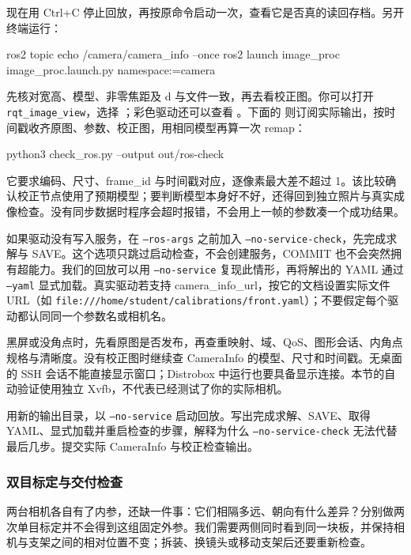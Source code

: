 \begin{example}[从采样界面走到重启后的校正图]
现在用 Ctrl+C 停止回放，再按原命令启动一次，查看它是否真的读回存档。另开终端运行：
\begin{tbash}
ros2 topic echo /camera/camera_info --once
ros2 launch image_proc image_proc.launch.py namespace:=camera
\end{tbash}
先核对宽高、模型、非零焦距及 d 与文件一致，再去看校正图。你可以打开 \texttt{rqt\_image\_view}，选择 ；彩色驱动还可以查看 。下面的  则订阅实际输出，按时间戳收齐原图、参数、校正图，用相同模型再算一次 remap：


\begin{tbash}
python3 check_ros.py --output out/ros-check
\end{tbash}
它要求编码、尺寸、frame\_id 与时间戳对应，逐像素最大差不超过 1。该比较确认校正节点使用了预期模型；要判断模型本身好不好，还得回到独立照片与真实成像检查。没有同步数据时程序会超时报错，不会用上一帧的参数凑一个成功结果。
\end{example}

如果驱动没有写入服务，在 \texttt{--ros-args} 之前加入 \texttt{--no-service-check}，先完成求解与 SAVE。这个选项只跳过启动检查，不会创建服务，COMMIT 也不会突然拥有超能力。我们的回放可以用 \texttt{--no-service} 复现此情形，再将解出的 YAML 通过 \texttt{--yaml} 显式加载。真实驱动若支持 camera\_info\_url，按它的文档设置实际文件 URL（如 \nolinkurl{file:///home/student/calibrations/front.yaml}）；不要假定每个驱动都认同同一个参数名或相机名。

\begin{note}
黑屏或没角点时，先看原图是否发布，再查重映射、域、QoS、图形会话、内角点规格与清晰度。没有校正图时继续查 CameraInfo 的模型、尺寸和时间戳。无桌面的 SSH 会话不能直接显示窗口；Distrobox 中运行也要具备显示连接。本节的自动验证使用独立 Xvfb，不代表已经测试了你的实际相机。
\end{note}
\begin{exercise}\label{ex:v2-camera-ros}
用新的输出目录，以 \texttt{--no-service} 启动回放。写出完成求解、SAVE、取得 YAML、显式加载并重启检查的步骤，解释为什么 \texttt{--no-service-check} 无法代替最后几步。提交实际 CameraInfo 与校正检查输出。
\end{exercise}

\subsubsection{双目标定与交付检查}
两台相机各自有了内参，还缺一件事：它们相隔多远、朝向有什么差异？分别做两次单目标定并不会得到这组固定外参。我们需要两侧同时看到同一块板，并保持相机与支架之间的相对位置不变；拆装、换镜头或移动支架后还要重新检查。

